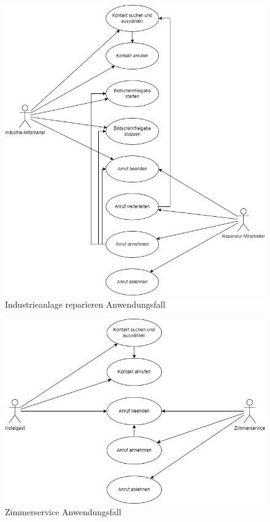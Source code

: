 \begin{figure}[ht!]
    \centering
    \includegraphics[width=\paperwidth-2in]{../assets/img/UML-Anwendungsfalldiagramme-Industrieanlage reparieren.drawio}
    \caption{Industrieanlage reparieren Anwendungsfall}
    \label{fig:industrieanlage-reparieren}
\end{figure}

\begin{figure}[ht!]
    \centering
    \includegraphics[width=\paperwidth-2in]{../assets/img/UML-Anwendungsfalldiagramme-Zimmerservice.drawio}
    \caption{Zimmerservice Anwendungsfall}
    \label{fig:zimmerservice}
\end{figure}


